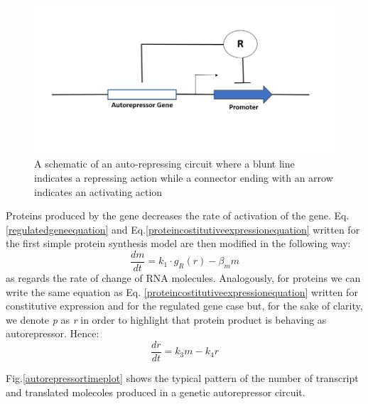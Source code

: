 \documentclass[12pt,a4paper]{report}
\begin{document}
\begin{figure}[!ht]
\centering
\includegraphics[scale=0.50]{autorepressor.jpg}
\caption{A schematic of an auto-repressing circuit where a blunt line indicates a repressing action while a connector ending with an arrow indicates an activating action}
\label{autorepressor}
\end{figure}

Proteins produced by the gene decreases the rate of activation of the gene. Eq.\ref{regulatedgeneequation} and Eq.\ref{proteincostitutiveexpressionequation} written for the first simple protein synthesis model are then modified in the following way:
\begin{equation}
 \frac{dm}{dt} = k_{1} \cdot g_{R}(r) - \beta_{m}m
\end{equation}
as regards the rate of change of RNA molecules. Analogously, for proteins we can write the same equation as Eq. \ref{proteincostitutiveexpressionequation} written for constitutive expression and for the regulated gene case but, for the sake of clarity, we denote \emph{p} as \emph{r} in order to highlight that protein product is behaving as autorepressor. Hence:
\begin{equation}
 \frac{dr}{dt} = k_{3}m - k_{4}r
\end{equation}

Fig.\ref{autorepressortimeplot} shows the typical pattern of the number of transcript and translated molecoles produced in a genetic autorepressor circuit.
\end{document}
